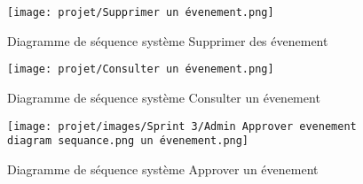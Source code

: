 \begin{figure}[H]
    \centering
    \texttt{[image: projet/Supprimer un évenement.png]}
    \caption{Diagramme de séquence système Supprimer des évenement}
    \label{fig:diagramme3}
\end{figure}
\begin{figure}[H]
    \centering
    \texttt{[image: projet/Consulter un évenement.png]}
    \caption{Diagramme de séquence système Consulter un évenement}
    \label{fig:diagramme3}
\end{figure}
\begin{figure}[H]
    \centering
    \texttt{[image: projet/images/Sprint 3/Admin Approver evenement diagram sequance.png un évenement.png]}
    \caption{Diagramme de séquence système Approver un évenement}
    \label{fig:diagramme3}
\end{figure}
